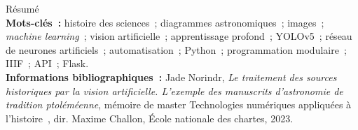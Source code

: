 \medskip	

Résumé\\

\textbf{Mots-clés~:} histoire des sciences~; diagrammes astronomiques~; images~; \textit{machine learning}~; vision artificielle~; apprentissage profond~; YOLOv5~; réseau de neurones artificiels~; automatisation~; Python~; programmation modulaire~; IIIF~; API~; Flask.\\

\textbf{Informations bibliographiques~:} Jade Norindr, \textit{Le traitement des sources historiques par la vision artificielle. L'exemple des manuscrits d'astronomie de tradition ptoléméenne}, mémoire de master \og Technologies numériques appliquées à l'histoire~\fg, dir. Maxime Challon, École nationale des chartes, 2023.	
\clearemptydoublepage